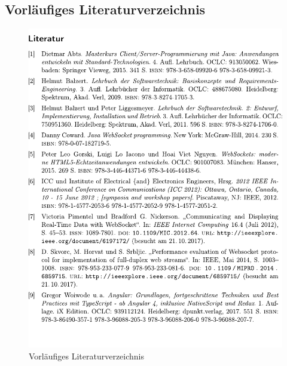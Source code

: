 \documentclass[11pt,a4paper,titlepage]{scrartcl}
\numberwithin{equation}{section}
\begin{document}
\subsection{Vorläufiges Literaturverzeichnis}
	\begin{figure}[!ht] \label{fig:vz}
	\begin{center}
		\includegraphics[scale=0.9]{img/vorlvz.pdf}
		\caption{Vorläufiges Literaturverzeichnis}
	\end{center}
\end{figure}




\end{document}
